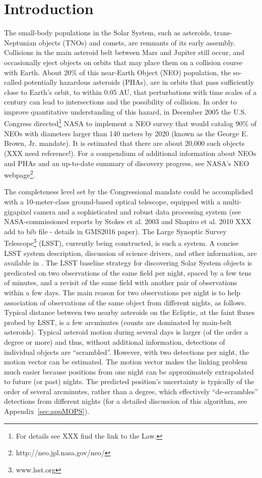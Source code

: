 
\section{Introduction}

The small-body populations in the Solar System, such as asteroids, trans-Neptunian objects (TNOs) 
and comets, are remnants of its early assembly. Collisions in the main asteroid belt between Mars and 
Jupiter still occur, and occasionally eject objects on orbits that may place them on a collision course 
with Earth. About 20\% of this near-Earth Object (NEO) population, the so-called potentially hazardous 
asteroids (PHAs), are in orbits that pass sufficiently close to Earth's orbit, to within 0.05 AU, that 
perturbations with time scales of a century can lead to intersections and the possibility of collision. 
In order to improve quantitative understanding of this hazard, in December 2005 the U.S. Congress
directed\footnote{For details see XXX find the link to the Law.} NASA to implement a NEO survey that 
would catalog 90\% of NEOs with diameters larger than 140 meters by 2020 (known as the George 
E. Brown, Jr. mandate). It is estimated that there are about 20,000 such objects (XXX need reference!). 
For a compendium of additional information about NEOs and PHAs and an up-to-date summary of 
discovery progress, see NASA's NEO webpage\footnote{http://neo.jpl.nasa.gov/neo/}. 

The completeness level set by the Congressional mandate could be accomplished with a 10-meter-class 
ground-based optical telescope, equipped with a multi-gigapixel camera and a sophisticated and robust data 
processing system (see NASA-commissioned reports by Stokes et al. 2003 and Shapiro et al. 2010 
XXX add to bib file - details in GMS2016 paper). The Large Synoptic Survey Telescope\footnote{www.lsst.org} (LSST), currently being 
constructed, is such a system. A concise LSST system description, discussion of science drivers, and other 
information, are available in \cite{LSSToverview}. The LSST baseline strategy for discovering Solar System 
objects is predicated on two observations of the same field per night, spaced by a few tens of minutes, and 
a revisit of the same field with another pair of observations within a few days. The main reason for two
observations per night is to help association of observations of the same object from different nights, 
as follows. Typical distance between two nearby asteroids on the Ecliptic, at the faint fluxes probed by 
LSST, is a few arcminutes (counts are dominated by main-belt asteroids). Typical asteroid motion
during several days is larger (of the order a degree or more) and thus, without additional information, 
detections of individual objects are ``scrambled''. However, with two detections per night, the motion 
vector can be estimated. The motion vector makes the linking problem much easier because
positions from one night can be approximately extrapolated to future (or past) nights. The predicted
position's uncertainty is typically of the order of several arcminutes, rather than a degree, which effectively 
``de-scrambles'' detections from different nights (for a detailed discussion of this algorithm, see 
Appendix~\ref{sec:appMOPS}). 

